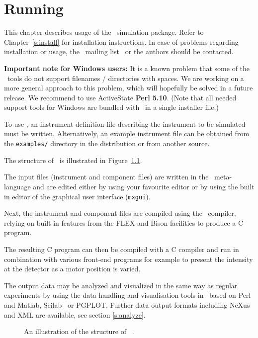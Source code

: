 
\chapter{Running \MCX}
\label{c:running}
This chapter describes usage of the \MCX\ simulation package. Refer
to Chapter~\ref{s:install} for installation instructions. In case of
problems regarding installation or usage, the \MCX\ mailing
list~\cite{mcxtrace_webpage} or the authors should be contacted.

{\bf Important note for Windows users:} It is a known problem that some of
the \MCX\ tools do not support filenames / directories with spaces.
We are working on a more general approach to this problem, which will
hopefully be solved in a future release. We recommend to use
ActiveState {\bf Perl 5.10}. (Note that all needed
support tools for Windows are bundled with \MCX\ in a single installer file.)

To use \MCX, an instrument
definition file describing the instrument to be simulated must be
written. Alternatively, an example instrument file can be obtained
from the \verb+examples/+ directory in the distribution or from
another source.

The structure of \MCX\ is illustrated in Figure~\ref{fig:structure}.

The input files (instrument and component files) are written in the \MCX\
meta-language and are edited either by using your favourite editor
or by using the built in editor of the graphical user interface
(\texttt{mxgui}).

Next, the instrument and component files are compiled using the \MCX\
compiler, relying on built in features from the FLEX and Bison facilities to produce a C program.

The resulting C program can then be
compiled with a C compiler and run in combination with various
front-end programs for example to present the intensity at the
detector as a motor position is varied.

The output data may be analyzed and visualized in the same way as
regular experiments by using the data handling and visualisation tools in \MCX\ based on
Perl and Matlab, Scilab~\cite{scilab_webpage} or PGPLOT. Further data
output formats including NeXus and XML are available, see section \ref{s:analyze}.

\begin{figure}[htb!]
\begin{center}

\end{center}
\caption{An illustration of the structure of \MCX\ .}
\label{fig:structure}
\end{figure}

